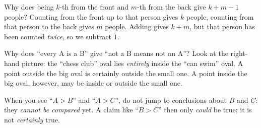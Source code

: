 \documentclass[11pt]{article}
\begin{document}
\begin{proofbox}
Why does being $k$-th from the front and $m$-th from the back give $k+m-1$ people? Counting from the front up to that person gives
$k$ people, counting from that person to the back gives $m$ people. Adding gives $k+m$, but that person has been counted \emph{twice},
so we subtract $1$.

Why does ``every A is a B'' give ``not a B means not an A''? Look at the right-hand picture: the ``chess club'' oval lies
\emph{entirely} inside the ``can swim'' oval. A point outside the big oval is certainly outside the small one. A point inside the big
oval, however, may be inside or outside the small one.
\end{proofbox}
\begin{warnbox}
When you see ``$A > B$'' and ``$A > C$'', do not jump to conclusions about $B$ and $C$: they \emph{cannot be compared} yet. A claim
like ``$B > C$'' then only \emph{could} be true; it is not \emph{certainly} true.
\end{warnbox}
\end{document}
